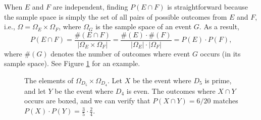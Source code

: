 \documentclass{book}
\begin{document}










\begin{exercise*}[\ref{q:cap}]
When $E$ and $F$ are independent, finding $P(E \cap F)$ is straightforward because the sample space is simply the set of all pairs of possible outcomes from $E$ and $F$, i.e., $\Omega = \Omega_E \times \Omega_F$, where $\Omega_G$ is the sample space of an event $G$. As a result,
\begin{equation*}
P(E \cap F) = \frac{\#(E \cap F)}{|\Omega_E \times \Omega_F|}
= \frac{\#(E) \cdot \#(F)}{|\Omega_E| \cdot |\Omega_F|}
= P(E) \cdot P(F),
\end{equation*} 
where $\#(G)$ denotes the number of outcomes where event $G$ occurs (in its sample space). See Figure \ref{product} for an example.
\end{exercise*}

\begin{figure}[ht]
\centering

\caption{The elements of $\Omega_{D_5} \times \Omega_{D_4}$. Let $X$ be the event where $D_5$ is prime, and let $Y$ be the event where $D_4$ is even. The outcomes where $X \cap Y$ occurs are boxed, and we can verify that $P(X \cap Y) = 6/20$ matches $P(X) \cdot P(Y) = \frac{3}{5} \cdot \frac{2}{4}$.}
\label{product}
\end{figure}
\end{document}
